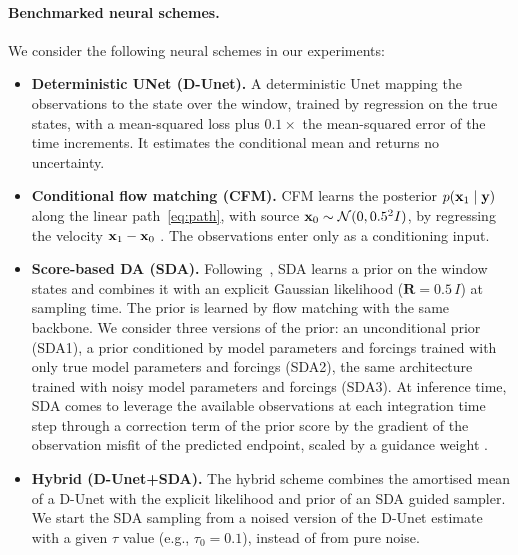 \paragraph{Benchmarked neural schemes.} We consider the following neural schemes in our experiments:
\begin{itemize}[leftmargin=*]
  \item \textbf{Deterministic UNet (D-Unet).} A deterministic Unet mapping the  observations to the state over the window, trained by regression on the true states, with a mean-squared    loss plus $0.1\times$ the mean-squared error of the time increments. It estimates  the conditional mean and returns no uncertainty.
  \item \textbf{Conditional flow matching (CFM).} CFM learns the posterior
    $p(\mathbf{x}_1 \mid \mathbf{y})$ along the linear path~\eqref{eq:path}, with source
    $\mathbf{x}_0 \sim \mathcal{N}(0, 0.5^2 I)$, by regressing the velocity
    $\mathbf{x}_1 - \mathbf{x}_0$ \cite{lipman_flow_2023,albergo_stochastic_2025}. The
    observations enter only as a conditioning input.
  \item \textbf{Score-based DA (SDA).} Following~\cite{rozet_score-based_2023}, SDA
    learns a prior on the window states and combines it with an explicit Gaussian
    likelihood ($\mathbf{R} = 0.5\,I$) at sampling time. The prior is learned by flow
    matching with the same backbone. We consider three versions of the prior: an unconditional prior (SDA1), a prior conditioned by model parameters and forcings trained with only true model parameters and forcings (SDA2), the same architecture trained with noisy model parameters and forcings (SDA3). At inference time, SDA comes to leverage the available observations at each integration time step through a correction term of the prior score  by the gradient of the observation misfit of the predicted endpoint, scaled by a guidance weight  \cite{chung_diffusion_2022}.
  \item \textbf{Hybrid (D-Unet+SDA).} The hybrid scheme combines the amortised mean of a D-Unet with the explicit likelihood and prior of an SDA guided sampler. We start the SDA sampling from a noised version of the D-Unet estimate with a given $\tau$ value (e.g., $\tau_0 = 0.1$), instead of from pure noise. 
\end{itemize}

